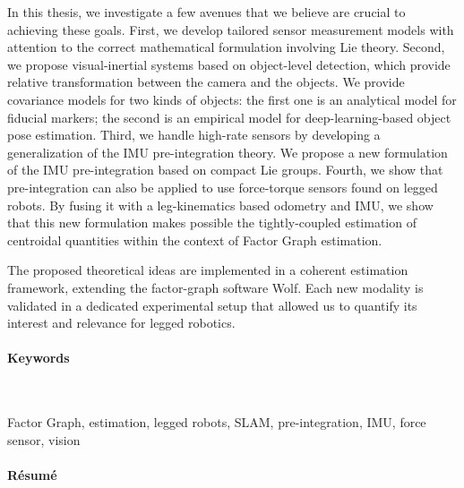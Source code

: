 In this thesis, we investigate a few avenues that we believe are crucial to achieving these goals. First, we develop tailored sensor measurement models with attention to the correct mathematical formulation involving Lie theory.
Second, we propose visual-inertial systems based on object-level detection, which provide relative transformation between the camera and the objects.
We provide covariance models for two kinds of objects: the first one is an analytical model for fiducial markers; the second
is an empirical model for deep-learning-based object pose estimation.
Third, we handle high-rate sensors by developing a generalization of the IMU pre-integration theory. We propose a new formulation of the IMU
pre-integration based on compact Lie groups. 
Fourth, we show that pre-integration can also be applied to use force-torque sensors found on legged robots. 
By fusing it with a leg-kinematics based odometry and IMU, we show that this new formulation makes possible the tightly-coupled estimation
of centroidal quantities within the context of Factor Graph estimation.

The proposed theoretical ideas are implemented in a coherent estimation framework, extending the factor-graph software Wolf. Each new modality is validated in a dedicated experimental setup that allowed us to quantify its interest and relevance for legged robotics.



\paragraph{Keywords}~

Factor Graph, estimation, legged robots, SLAM, pre-integration, IMU, force sensor, vision 

\noindent\makebox[\linewidth]{\rule{0.6\textwidth}{2pt}}



\newpage


\noindent\makebox[\linewidth]{\rule{0.6\textwidth}{2pt}}


\paragraph{Résumé}~

